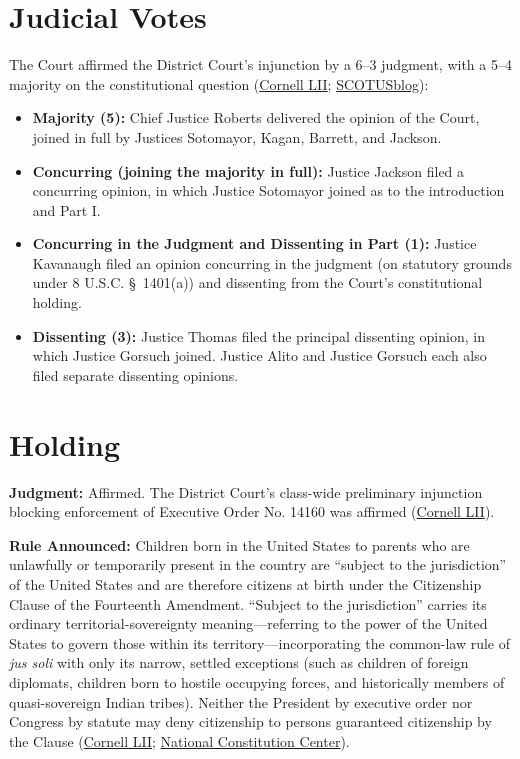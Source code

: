 \documentclass[12pt]{article}
\begin{document}
\section{Judicial Votes}
The Court affirmed the District Court's injunction by a 6--3 judgment, with a 5--4 majority on the constitutional question (\href{https://www.law.cornell.edu/supremecourt/text/25-365}{Cornell LII}; \href{https://www.scotusblog.com/2026/06/breaking-down-the-birthright-citizenship-decision/}{SCOTUSblog}):
\begin{itemize}
\item \textbf{Majority (5):} Chief Justice Roberts delivered the opinion of the Court, joined in full by Justices Sotomayor, Kagan, Barrett, and Jackson.
\item \textbf{Concurring (joining the majority in full):} Justice Jackson filed a concurring opinion, in which Justice Sotomayor joined as to the introduction and Part I.
\item \textbf{Concurring in the Judgment and Dissenting in Part (1):} Justice Kavanaugh filed an opinion concurring in the judgment (on statutory grounds under 8 U.S.C. \S\ 1401(a)) and dissenting from the Court's constitutional holding.
\item \textbf{Dissenting (3):} Justice Thomas filed the principal dissenting opinion, in which Justice Gorsuch joined. Justice Alito and Justice Gorsuch each also filed separate dissenting opinions.
\end{itemize}

\section{Holding}
\textbf{Judgment:} Affirmed. The District Court's class-wide preliminary injunction blocking enforcement of Executive Order No. 14160 was affirmed (\href{https://www.law.cornell.edu/supremecourt/text/25-365}{Cornell LII}).

\textbf{Rule Announced:} Children born in the United States to parents who are unlawfully or temporarily present in the country are ``subject to the jurisdiction'' of the United States and are therefore citizens at birth under the Citizenship Clause of the Fourteenth Amendment. ``Subject to the jurisdiction'' carries its ordinary territorial-sovereignty meaning---referring to the power of the United States to govern those within its territory---incorporating the common-law rule of \textit{jus soli} with only its narrow, settled exceptions (such as children of foreign diplomats, children born to hostile occupying forces, and historically members of quasi-sovereign Indian tribes). Neither the President by executive order nor Congress by statute may deny citizenship to persons guaranteed citizenship by the Clause (\href{https://www.law.cornell.edu/supremecourt/text/25-365}{Cornell LII}; \href{https://constitutioncenter.org/blog/supreme-court-strikes-down-trumps-birthright-citizenship-executive-order-in-landmark-decision}{National Constitution Center}).
\end{document}
